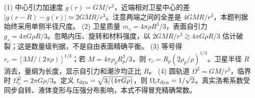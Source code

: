 (1) 中心引力加速度 \(g(r)=GM/r^2\)，近端相对卫星中心的差 \(|g(r-R)-g(r)|\simeq2GMR/r^3\)。注意两端之间的全差是 \(4GMR/r^3\)，本题判据始终采用单侧半径尺度。
(2) 卫星质量 \(m_s=4\pi\rho R^3/3\)，表面自引力 \(g_s=4\pi G\rho R/3\)。忽略内压、旋转和材料强度，以 \(2GMR/r^3\gtrsim4\pi G\rho R/3\) 估计破裂；这是数量级判据，不是自由表面精确平衡。
(3) 等号得 \(r_c=[3M/(2\pi\rho)]^{1/3}\)；若 \(M=4\pi\rho_pR_p^3/3\)，则 \(r_c=R_p(2\rho_p/\rho)^{1/3}\)。卫星半径 \(R\) 消去，量纲为长度，显示自引力和潮汐均正比 \(R\)。
(4) 圆轨道 \(\Omega^2=GM/r^3\)，临界时 \(\Omega_c^2=2\pi G\rho/3\)。定义 \(t_{\rm dyn}=\sqrt{3/(4\pi G\rho)}\)，则 \(\Omega_ct_{\rm dyn}=1/\sqrt2\)。真实洛希系数受同步自转、液体变形与压强分布影响，本式不得冒充精确常数。
